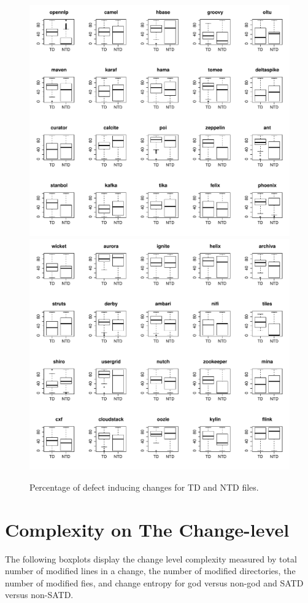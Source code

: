 \begin{figure}[tb]
	\centering
	\includegraphics[width=120mm]{figures/chapter4/rq2_boxplots_1}
	\includegraphics[width=120mm]{figures/chapter4/rq2_boxplots_2}
	\caption{Percentage of defect inducing changes for TD and NTD files.}
	\label{figure:percentage_of_bug_inducing_td_vs_ntd}
\end{figure}



\chapter{Complexity on The Change-level}
The following boxplots display the change level complexity measured by total number of modified lines in a change, the number of modified directories, the number of modified fies, and change entropy for god versus non-god and SATD versus non-SATD.

